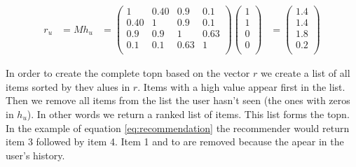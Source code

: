 \begin{align}
  \label{eq:recommendation}
r_u &= M h_u 
&=
\begin{pmatrix}
  1  & 0.40 & 0.9 & 0.1 \\
 0.40 &1  & 0.9 & 0.1 \\
  0.9 & 0.9 &1  & 0.63 \\
  0.1 & 0.1 & 0.63 &1 \\  
\end{pmatrix} 
\begin{pmatrix}
 1 \\
 1 \\
 0 \\
 0 \\
\end{pmatrix}
&= 
\begin{pmatrix}
 1.4 \\
 1.4 \\
 1.8 \\
 0.2 \\
\end{pmatrix}
\end{align}

In order to create the complete \gls{topn} based on the vector $r$ we create a list of all items sorted by thev alues in $r$. Items with a high value appear first in the list. Then we remove all items from the list the user hasn't seen (the ones with zeros in $h_u$). In other words we return a ranked list of items. This list forms the \gls{topn}. In the example of equation \ref{eq:recommendation} the recommender would return item 3 followed by item 4. Item 1 and to are removed because the apear in the user's history.
